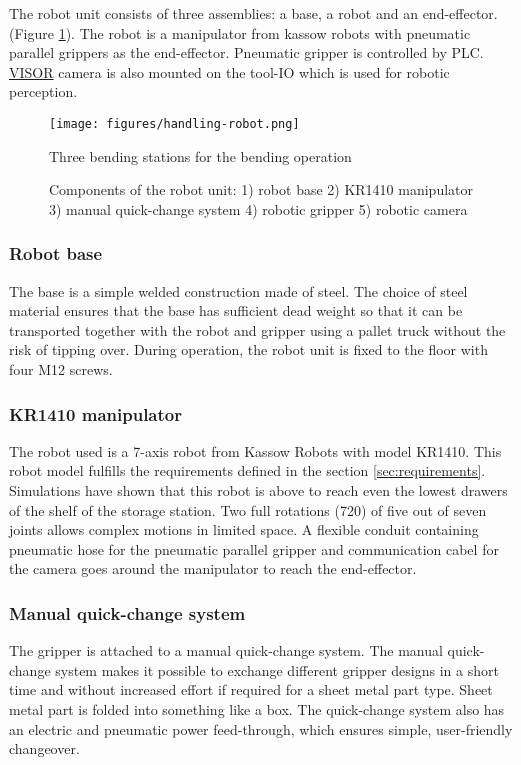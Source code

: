 The robot unit consists of three assemblies: a base, a robot and an end-effector. (Figure \ref{fig:robot-installation}).
The robot is a manipulator from kassow robots with pneumatic parallel grippers as the end-effector.
Pneumatic gripper is controlled by PLC. \hyperref[acro:VISOR]{VISOR\textsuperscript{\textregistered}} camera is also mounted on the tool-IO which is used for robotic perception.


\begin{figure}[h]
    \centering
    \texttt{[image: figures/handling-robot.png]}
    \caption{Three bending stations for the bending operation}
    \caption{Components of the robot unit: 1) robot base 2) KR1410 manipulator 3) manual quick-change system 4) robotic gripper 5) robotic camera}
    \label{fig:robot-installation}
\end{figure}



\subsubsection{Robot base}
The base is a simple welded construction made of steel. The choice of steel material ensures that the base has
sufficient dead weight so that it can be transported together with the robot and gripper using a pallet
truck without the risk of tipping over. During operation, the robot unit is fixed to the floor with four M12
screws. 

\subsubsection{KR1410 manipulator}
The robot used is a 7-axis robot from Kassow Robots with model KR1410. This robot model fulfills the requirements defined in 
the section \ref{sec:requirements}. Simulations have shown that this robot is above to reach even the lowest drawers of the shelf of the
storage station. Two full rotations (720\textdegree) of five out of seven joints allows complex motions in limited space.
A flexible conduit containing pneumatic hose for the pneumatic parallel gripper and communication cabel for the camera goes around the manipulator to reach the end-effector.



\subsubsection{Manual quick-change system}
The gripper is attached to a manual quick-change
system. The manual quick-change system makes it possible to exchange different gripper
designs in a short time and without increased effort if required for a sheet metal part type. Sheet metal
part is folded into something like a box. The quick-change system also has an electric and pneumatic power feed-through, which ensures simple,
user-friendly changeover.


